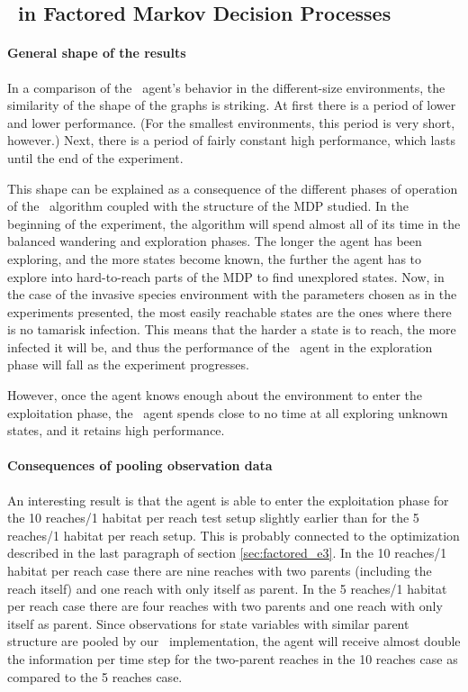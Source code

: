 \subsection{\etre\ in Factored Markov Decision Processes 
}
\label{sec:e3_factored_discussion}

\paragraph{General shape of the results} In a comparison of the \etre\ agent's behavior in the different-size environments, the similarity of the shape of the graphs is striking. At first there is a period of lower and lower performance. (For the smallest environments, this period is very short, however.) Next, there is a period of fairly constant high performance, which lasts until the end of the experiment.  

This shape can be explained as a consequence of the different phases of operation of the \etre\ algorithm coupled with the structure of the MDP studied. In the beginning of the experiment, the algorithm will spend almost all of its time in the balanced wandering and exploration phases. The longer the agent has been exploring, and the more states become known, the further the agent has to explore into hard-to-reach parts of the MDP to find unexplored states. Now, in the case of the invasive species environment with the parameters chosen as in the experiments presented, the most easily reachable states are the ones where there is no tamarisk infection. This means that the harder a state is to reach, the more infected it will be, and thus the performance of the \etre\ agent in the exploration phase will fall as the experiment progresses. 

However, once the agent knows enough about the environment to enter the exploitation phase, the \etre\ agent spends close to no time at all exploring unknown states, and it retains high performance. 

\paragraph{Consequences of pooling observation data} An interesting result is that the agent is able to enter the exploitation phase for the 10 reaches/1 habitat per reach test setup slightly earlier than for the 5 reaches/1 habitat per reach setup. This is probably connected to the optimization described in the last paragraph of section \ref{sec:factored_e3}. In the 10 reaches/1 habitat per reach case there are nine reaches with two parents (including the reach itself) and one reach with only itself as parent. In the 5 reaches/1 habitat per reach case there are four reaches with two parents and one reach with only itself as parent. Since observations for state variables with similar parent structure are pooled by our \etre\ implementation, the agent will receive almost double the information per time step for the two-parent reaches in the 10 reaches case as compared to the 5 reaches case.  

